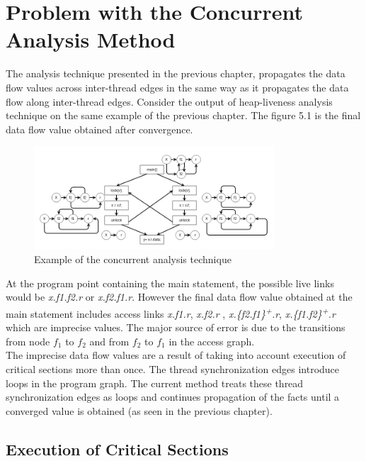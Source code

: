 \chapter{Problem with the Concurrent Analysis Method}

The analysis technique presented in the previous chapter, propagates the data flow values across inter-thread edges in the same way as it propagates the data flow along inter-thread edges. Consider the output of heap-liveness analysis technique on the same example of the previous chapter. The figure 5.1 is the final data flow value obtained after convergence. \\

	\begin{figure}
		\centering
		\includegraphics[width=0.8\textwidth]{Figures/conc_analysis_itr4.png}
		\caption{Example of the concurrent analysis technique}
		\label{fig:ch5example}
	\end{figure}


At the program point containing the main statement, the possible live links would be \emph{x.f1.f2.r} or \emph{x.f2.f1.r}. However the final data flow value  obtained at the main statement includes access links \emph{x.f1.r}, \emph{x.f2.r} , \emph {x.\{f2.f1\}\textsuperscript{+}.r}, \emph{x.\{f1.f2\}\textsuperscript{+}.r} which are imprecise values. The major source of error is due to the transitions from node $f_1$ to $f_2$ and from $f_2$ to $f_1$ in the access graph. \\

The imprecise data flow values are a result of taking into account execution of critical sections more than once. The thread synchronization edges introduce loops in the program graph. The current method treats these thread synchronization edges as loops and continues propagation of the facts until a converged value is obtained (as seen in the previous chapter). \\

\section{Execution of Critical Sections}

